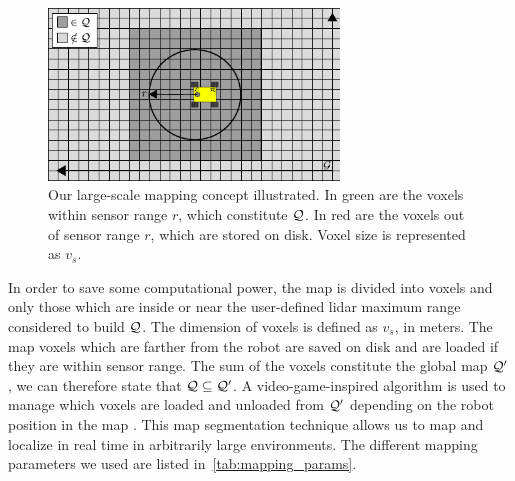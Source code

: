 \begin{figure}
	\centering
	\includegraphics[height=1.8in]{figs/tiled_mapping/tiled_mapping.pdf}
	\caption{Our large-scale mapping concept illustrated.
		In green are the voxels within sensor range $r$, which constitute $\mathcal{Q}$.
		In red are the voxels out of sensor range $r$, which are stored on disk.
		Voxel size is represented as $v_s$.}
	\label{fig:tiled_map}
\end{figure}

In order to save some computational power, the map is divided into voxels and only those which are inside or near the user-defined lidar maximum range considered to build $\mathcal{Q}$.
The dimension of voxels is defined as $v_s$, in meters. %
The map voxels which are farther from the robot are saved on disk and are loaded if they are within sensor range.
The sum of the voxels constitute the global map $\mathcal{Q}'$, we can therefore state that $\mathcal{Q} \subseteq \mathcal{Q}'$. %
A video-game-inspired algorithm is used to manage which voxels are loaded and unloaded from $\mathcal{Q}'$ depending on the robot position in the map \transform{\robotf}{\mapf}. %
This map segmentation technique allows us to map and localize in real time in arbitrarily large environments.
The different mapping parameters we used are listed in~\autoref{tab:mapping_params}.


